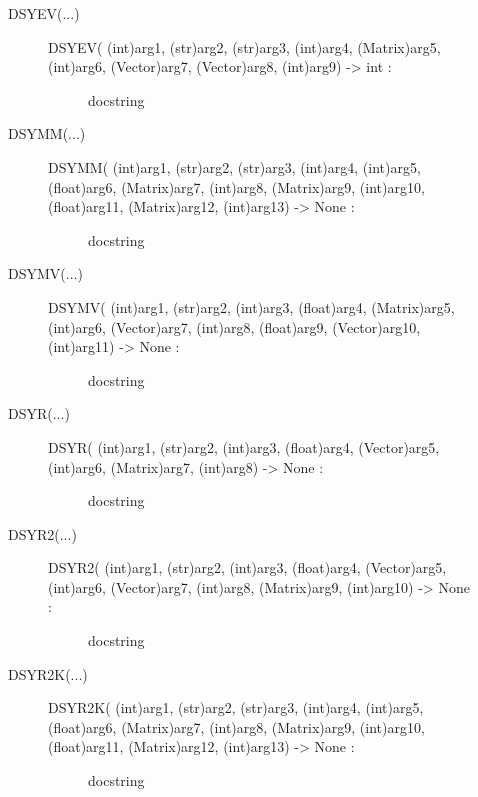 \documentclass[letterpaper,10pt,english]{sphinxmanual}
\begin{document}
\begin{description}
\begin{description}
\begin{description}
\end{description}

\item[{DSYEV(...)}] \leavevmode\begin{description}
\item[{DSYEV( (int)arg1, (str)arg2, (str)arg3, (int)arg4, (Matrix)arg5, (int)arg6, (Vector)arg7, (Vector)arg8, (int)arg9) -\textgreater{} int :}] \leavevmode
docstring

\end{description}

\item[{DSYMM(...)}] \leavevmode\begin{description}
\item[{DSYMM( (int)arg1, (str)arg2, (str)arg3, (int)arg4, (int)arg5, (float)arg6, (Matrix)arg7, (int)arg8, (Matrix)arg9, (int)arg10, (float)arg11, (Matrix)arg12, (int)arg13) -\textgreater{} None :}] \leavevmode
docstring

\end{description}

\item[{DSYMV(...)}] \leavevmode\begin{description}
\item[{DSYMV( (int)arg1, (str)arg2, (int)arg3, (float)arg4, (Matrix)arg5, (int)arg6, (Vector)arg7, (int)arg8, (float)arg9, (Vector)arg10, (int)arg11) -\textgreater{} None :}] \leavevmode
docstring

\end{description}

\item[{DSYR(...)}] \leavevmode\begin{description}
\item[{DSYR( (int)arg1, (str)arg2, (int)arg3, (float)arg4, (Vector)arg5, (int)arg6, (Matrix)arg7, (int)arg8) -\textgreater{} None :}] \leavevmode
docstring

\end{description}

\item[{DSYR2(...)}] \leavevmode\begin{description}
\item[{DSYR2( (int)arg1, (str)arg2, (int)arg3, (float)arg4, (Vector)arg5, (int)arg6, (Vector)arg7, (int)arg8, (Matrix)arg9, (int)arg10) -\textgreater{} None :}] \leavevmode
docstring

\end{description}

\item[{DSYR2K(...)}] \leavevmode\begin{description}
\item[{DSYR2K( (int)arg1, (str)arg2, (str)arg3, (int)arg4, (int)arg5, (float)arg6, (Matrix)arg7, (int)arg8, (Matrix)arg9, (int)arg10, (float)arg11, (Matrix)arg12, (int)arg13) -\textgreater{} None :}] \leavevmode
docstring


\end{description}
\end{description}
\end{description}
\end{document}
